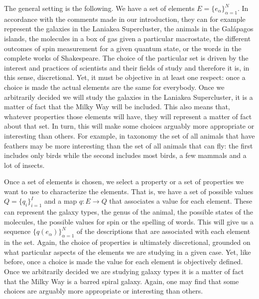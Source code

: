 \documentclass{article}
\begin{document}
The general setting is the following. We have a set of elements $E = \{e_\alpha\}_{\alpha=1}^N$. In accordance with the comments made in our introduction, they can for example represent the galaxies in the Laniakea Supercluster, the animals in the Gal\'{a}pagos islands, the molecules in a box of gas given a particular macrostate, the different outcomes of spin measurement for a given quantum state, or the words in the complete works of Shakespeare. The choice of the particular set is driven by the interest and practices of scientists and their fields of study and therefore it is, in this sense, discretional. Yet, it must be objective in at least one respect: once a choice is made the actual elements are the same for everybody. Once we arbitrarily decided we will study the galaxies in the Laniakea Supercluster, it is a matter of fact that the Milky Way will be included. This also means that, whatever properties those elements will have, they will represent a matter of fact about that set. In turn, this will make some choices arguably more appropriate or interesting than others. For example, in taxonomy the set of all animals that have feathers may be more interesting than the set of all animals that can fly: the first includes only birds while the second includes most birds, a few mammals and a lot of insects.

Once a set of elements is chosen, we select a property or a set of properties we want to use to characterize the elements. That is, we have a set of possible values $Q=\{q_i\}_{i=1}^I$ and a map $q : E \to Q$ that associates a value for each element. These can represent the galaxy types, the genus of the animal, the possible states of the molecules, the possible values for spin or the spelling of words. This will give us a sequence $\{q(e_\alpha)\}_{\alpha=1}^N$ of the descriptions that are associated with each element in the set. Again, the choice of properties is ultimately discretional, grounded on what particular aspects of the elements we are studying in a given case. Yet, like before, once a choice is made the value for each element is objectively defined. Once we arbitrarily decided we are studying galaxy types it is a matter of fact that the Milky Way is a barred spiral galaxy. Again, one may find that some choices are arguably more appropriate or interesting than others.
\end{document}
